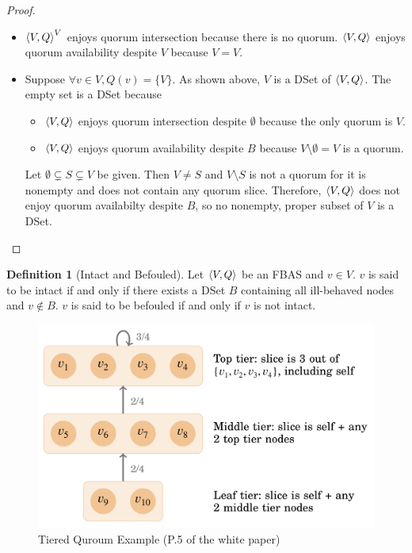 \documentclass[12pt, psamsfonts]{amsart}
\theoremstyle{definition}
\newtheorem{defn}[thm]{Definition}
\theoremstyle{remark}
\numberwithin{equation}{subsection}
\begin{document}
\begin{proof}
    $ $
    \begin{itemize}
        \item
            $\ev{V, Q}^V$ enjoys quorum intersection because there is no quorum.
            $\ev{V, Q}$ enjoys quorum availability despite $V$ because $V = V$.
        \item
            Suppose $\forall v \in V, Q(v) = \{ V \}$.
            As shown above, $V$ is a DSet of $\ev{V, Q}$.
            The empty set is a DSet because
            \begin{itemize}
                \item
                    $\ev{V, Q}$ enjoys quorum intersection despite $\emptyset$ because the only quorum is $V$.
                \item
                    $\ev{V, Q}$ enjoys quorum availability despite $B$ because $V \setminus \emptyset = V$ is a quorum.
            \end{itemize}
            Let $\emptyset \subsetneq S \subsetneq V$ be given.
            Then $V \ne S$ and $V \setminus S$ is not a quorum for it is nonempty and does not contain any quorum slice.
            Therefore, $\ev{V, Q}$ does not enjoy quorum availabilty despite $B$, so no nonempty, proper subset of $V$ is a DSet.
    \end{itemize}
\end{proof}

\begin{defn}[Intact and Befouled]\label{def_intact_befouled}
    Let $\ev{V, Q}$ be an FBAS and $v \in V$.
    $v$ is said to be intact if and only if there exists a DSet $B$ containing all ill-behaved nodes and $v \notin B$.
    $v$ is said to be befouled if and only if $v$ is not intact.
\end{defn}

\begin{figure}[!htb]
    \includegraphics[width=.5\linewidth]{img/tiered_quorum_example.jpeg}
        \caption{Tiered Quroum Example (P.5 of the white paper)}
    \label{fig:tiered_quorum_example}
\end{figure}
\end{document}
